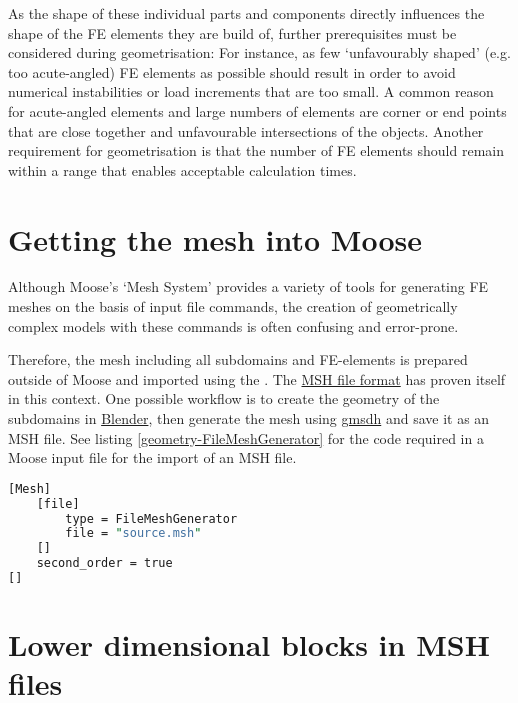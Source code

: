 As the shape of these individual parts and components directly influences the
shape of the FE elements they are build of, further prerequisites must be
considered during geometrisation: For instance, as few ‘unfavourably shaped’
(e.g. too acute-angled) FE elements as possible should result in order to avoid
numerical instabilities or load increments that are too small. A common reason
for acute-angled elements and large numbers of elements are corner or end
points that are close together and unfavourable intersections of the objects.
Another requirement for geometrisation is that the number of FE elements should
remain within a range that enables acceptable calculation times.

\section{Getting the mesh into Moose}
\label{geometry-getting-the-mesh-into-moose}

Although Moose's ‘Mesh System’ provides a variety of tools for generating FE
meshes on the basis of input file commands, the creation of geometrically
complex models with these commands is often confusing and error-prone.

Therefore, the mesh including all subdomains and FE-elements is prepared
outside of Moose and imported using the . The
\href{https://gmsh.info/doc/texinfo/gmsh.html#MSH-file-format}{MSH file format}
has proven itself in this context. One possible workflow is to create the
geometry of the subdomains in \href{https://blender.org}{Blender}, then
generate the mesh using \href{https://gmsh.info/}{gmsdh} and save it as an MSH
file. See listing \autoref{geometry-FileMeshGenerator} for the code required in
a Moose input file for the import of an MSH file.

\begin{lstlisting}[language=perl, float, caption={Read mesh from a file},label={geometry-FileMeshGenerator}]
[Mesh]
    [file]
        type = FileMeshGenerator
        file = "source.msh"
    []
    second_order = true
[]
\end{lstlisting}

\section{Lower dimensional blocks in MSH files}
\label{geometry-MSH}


